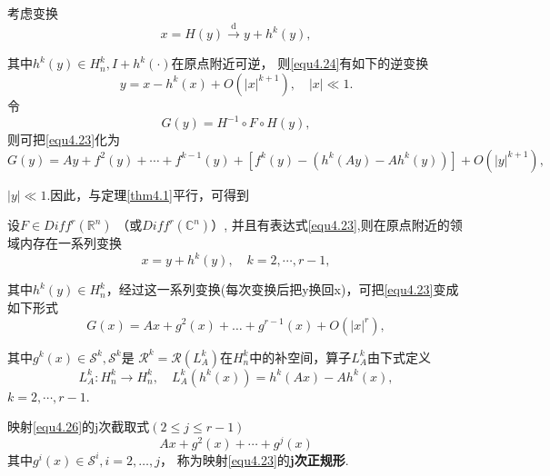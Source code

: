 考虑变换
\begin{equation}
x = H ( y ) \stackrel { \mathrm { d } } { \longrightarrow } y + h ^ { k } ( y ),
\label{eq:1.4.24}
\end{equation}

其中$h ^ { k } ( y ) \in H _ { n } ^ { k } , I + h ^ { k } ( \cdot )$在原点附近可逆，
则\ref{equ4.24}有如下的逆变换
\[
y = x - h ^ { k } ( x ) + O \left( | x | ^ { k + 1 } \right) , \quad | x | \ll 1.
\]
令
\[
G ( y ) = H ^ { - 1 } \circ F \circ H ( y ),
\]
则可把\ref{equ4.23}化为  
\[
  G ( y ) = A y + f ^ { 2 } ( y ) + \cdots + f ^ { k - 1 } ( y ) +
  \left[ f ^ { k } ( y ) - \left( h ^ { k } ( A y ) - A h ^ { k } ( y ) \right) \right] + O \left( | y | ^ { k + 1 } \right),
\]

$| y | \ll 1$.因此，与定理\ref{thm4.1}平行，可得到


\begin{theorem}
  设$F \in D i f f ^ { r } \left(\mathbb{ R} ^ { n } \right)$
  （或$Diff^ { r } \left( \mathbb { C } ^ { n } \right)$）,
  并且有表达式\ref{equ4.23},则在原点附近的领域内存在一系列变换
  \begin{equation}
x = y + h ^ { k } ( y ) , \quad k = 2 , \cdots , r - 1,
\label{eq:1.4.25}
  \end{equation}

  其中$h ^ { k } ( y ) \in H _ { n } ^ { k }$，经过这一系列变换(每次变换后把y换回x)，可把\ref{equ4.23}变成如下形式
  \begin{equation}
G ( x ) = A x + g ^ { 2 } ( x ) + \dots + g ^ { r - 1 } ( x ) + O \left( | x | ^ { r } \right),
    \label{eq:1.4.26}
\end{equation}

其中$g ^ { k } ( x ) \in \mathscr { S } ^ { k } , \mathscr{S}^k$是
$\mathscr { R } ^ { k } = \mathscr { R } \left( L _ { A } ^ { k } \right)$在\(H_n^k\)中的补空间，算子\(L_A^k\)由下式定义
\[
  L _ { A } ^ { k } : H _ { n } ^ { k } \rightarrow H _ { n } ^ { k },
  \quad
  L _ { A } ^ { k } \left( h ^ { k } ( x ) \right) = h ^ { k } ( A x ) - A h ^ { k } ( x ),
\]
$k = 2 , \cdots , r - 1$.
\end{theorem}

\begin{defination}

  映射\ref{equ4.26}的j次截取式$( 2 \leqslant j \leqslant r - 1 )$
  \[
A x + g ^ { 2 } ( x ) + \cdots + g ^ { j } ( x )
\]
其中$g ^ { i } ( x ) \in \mathscr { S } ^ { i } , i = 2 , \dots , j$，
称为映射\ref{equ4.23}的\textbf{j次正规形}.
\end{defination}

